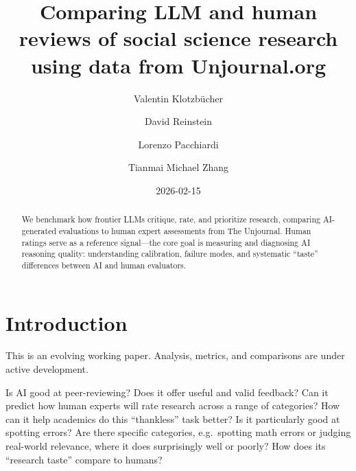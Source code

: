 \documentclass[
  11pt,
  letterpaper,
  DIV=11,
  numbers=noendperiod]{scrreprt}
\title{Comparing LLM and human reviews of social science research using
data from Unjournal.org}
\author{Valentin Klotzbücher \and David Reinstein \and Lorenzo
Pacchiardi \and Tianmai Michael Zhang}
\date{2026-02-15}
\renewcommand*\contentsname{Table of contents}
\newcommand\contentsname{Table of contents}
\begin{document}
\maketitle
\begin{abstract}
We benchmark how frontier LLMs critique, rate, and prioritize research,
comparing AI-generated evaluations to human expert assessments from The
Unjournal. Human ratings serve as a reference signal---the core goal is
measuring and diagnosing AI reasoning quality: understanding
calibration, failure modes, and systematic ``taste'' differences between
AI and human evaluators.
\end{abstract}

\renewcommand*\contentsname{Table of contents}
{
\hypersetup{linkcolor=}
\setcounter{tocdepth}{2}
\tableofcontents
}


\chapter{Introduction}\label{introduction}

\begin{tcolorbox}[enhanced jigsaw, colback=white, title=\textcolor{quarto-callout-note-color}{\faInfo}\hspace{0.5em}{Working paper}, bottomrule=.15mm, coltitle=black, left=2mm, colframe=quarto-callout-note-color-frame, toptitle=1mm, toprule=.15mm, titlerule=0mm, breakable, leftrule=.75mm, colbacktitle=quarto-callout-note-color!10!white, bottomtitle=1mm, arc=.35mm, rightrule=.15mm, opacityback=0, opacitybacktitle=0.6]

This is an evolving working paper. Analysis, metrics, and comparisons
are under active development.

\end{tcolorbox}

Is AI good at peer-reviewing? Does it offer useful and valid feedback?
Can it predict how human experts will rate research across a range of
categories? How can it help academics do this ``thankless'' task better?
Is it particularly good at spotting errors? Are there specific
categories, e.g.~spotting math errors or judging real-world relevance,
where it does surprisingly well or poorly? How does its ``research
taste'' compare to humans?
\end{document}
